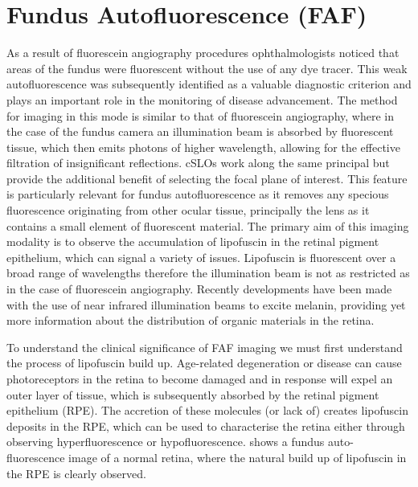 \section{Fundus Autofluorescence (FAF)}

As a result of fluorescein angiography procedures ophthalmologists noticed
that areas of the fundus were fluorescent without the use of any dye tracer.
This weak autofluorescence was subsequently identified as a valuable diagnostic
criterion and plays an important role in the monitoring of disease advancement.
The method for imaging in this mode is similar to that of fluorescein angiography,
where in the case of the fundus camera an illumination beam is absorbed by
fluorescent tissue, which then emits photons of higher wavelength, allowing
for the effective filtration of insignificant reflections. cSLOs work along
the same principal but provide the additional benefit of selecting the focal
plane of interest.\cite{schmitz2008fundus} This feature is particularly relevant
for fundus autofluorescence as it removes any specious fluorescence originating
from other ocular tissue, principally the lens as it contains a small element of
fluorescent material. \cite{von1995distribution} The primary aim of this imaging
modality is to observe the accumulation of lipofuscin in the retinal pigment
epithelium, which can signal a variety of issues. Lipofuscin is fluorescent over
a broad range of wavelengths therefore the illumination beam is not as restricted
as in the case of fluorescein angiography. Recently developments have been made
with the use of near infrared illumination beams to excite melanin, providing
yet more information about the distribution of organic materials in the retina.

To understand the clinical significance of FAF imaging we must first understand
the process of lipofuscin build up.\cite{kennedy1995lipofuscin} Age-related
degeneration or disease can cause photoreceptors in the retina to become
damaged and in response will expel an outer layer of tissue, which is
subsequently absorbed by the retinal pigment epithelium (RPE).\cite{spaide2003fundus}
The accretion of these molecules (or lack of) creates lipofuscin deposits
in the RPE, which can be used to characterise the retina either through
observing hyperfluorescence or hypofluorescence. shows a
fundus auto-fluorescence image of a normal retina, where the natural
build up of lipofuscin in the RPE is clearly observed.

